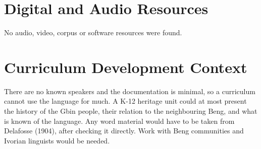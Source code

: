 \documentclass[12pt]{article}
\begin{document}
\section{Digital and Audio Resources}
No audio, video, corpus or software resources were found.

\section{Curriculum Development Context}
There are no known speakers and the documentation is minimal, so a curriculum cannot use the language for much. A K-12 heritage unit could at most present the history of the Gbin people, their relation to the neighbouring Beng, and what is known of the language. Any word material would have to be taken from Delafosse (1904), after checking it directly. Work with Beng communities and Ivorian linguists would be needed.
\end{document}
